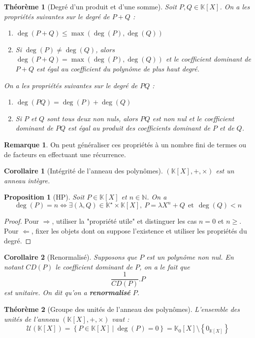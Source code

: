 \documentclass[french]{book}
\newcommand{\N}{\mathbb{N}}
\newcommand{\K}{\mathbb{K}}
\newcommand{\st}{^\star}
\theoremstyle{plain}
\newtheorem{thm}{Théorème}[chapter]
\newtheorem{prop}{Proposition}[chapter]
\newtheorem{cor}{Corollaire}[chapter]
\theoremstyle{definition}
\newtheorem{rmq}{Remarque}[chapter]
\theoremstyle{remark}
\begin{document}
\begin{thm}[Degré d'un produit et d'une somme]
	Soit $P,Q\in\K[X]$. On a les propriétés suivantes sur le degré de $P+Q$ :
	\begin{enumerate}
		\item $\deg(P+Q)\leqslant\max(\deg(P),\deg(Q))$
		\item Si $\deg(P)\ne\deg(Q)$, alors $\deg(P+Q)=\max(\deg(P),\deg(Q))$ et le coefficient dominant de $P+Q$ est égal au coefficient du polynôme de plus haut degré.
	\end{enumerate}
	On a les propriétés suivantes sur le degré de $PQ$ :
	\begin{enumerate}
		\item $\deg(PQ)=\deg(P)+\deg(Q)$
		\item Si $P$ et $Q$ sont tous deux non nuls, alors $PQ$ est non nul et le coefficient dominant de $PQ$ est égal au produit des coefficients dominant de $P$ et de $Q$.
	\end{enumerate}
\end{thm}
\begin{rmq}
	On peut généraliser ces propriétés à un nombre fini de termes ou de facteurs en effectuant une récurrence.
\end{rmq}
\begin{cor}[Intégrité de l'anneau des polynômes]
	$(\K[X],+,\times)$ est un anneau intègre.
\end{cor}
\begin{prop}[HP]
	Soit $P\in\K[X]$ et $n\in\N$. On a $$\deg(P)=n\iff\exists(\lambda,Q)\in\K\st\times\K[X], \ P=\lambda X^n+Q \ \ \text{et} \ \ \deg(Q)<n$$
\end{prop}
\begin{proof}
	Pour $\Rightarrow$, utiliser la "propriété utile" et distinguer les cas $n=0$ et $n\geqslant$. Pour $\Leftarrow$, fixer les objets dont on suppose l'existence et utiliser les propriétés du degré.
\end{proof}
\begin{cor}[Renormalisé]
	Supposons que $P$ est un polynôme non nul. En notant $CD(P)$ le coefficient dominant de $P$, on a le fait que $$\frac{1}{CD(P)}.P$$ est unitaire. On dit qu'on a \textbf{renormalisé} $P$.
\end{cor}
\begin{thm}[Groupe des unités de l'anneau des polynômes]
	L'ensemble des unités de l'anneau $(\K[X],+,\times)$ vaut : $$\mathcal{U}(\K[X])=\left\{P\in\K[X]\ | \ \deg(P)=0\right\}=\K_0[X]\setminus\left\{0_{\K[X]}\right\}$$
\end{thm}
\end{document}

